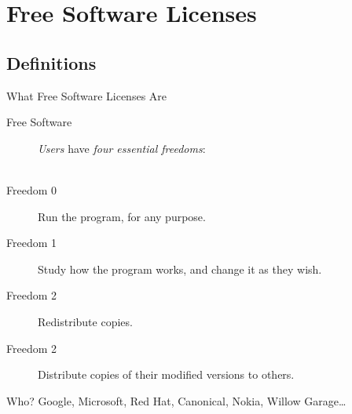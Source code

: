 
%

\begin{frame}[t,plain]
  \maketitle
\end{frame}

\begin{frame}
  \tableofcontents
\end{frame}

\section{Free Software Licenses}

  \begin{frame}
    \tableofcontents[currentsection]
  \end{frame}

%
\subsection{Definitions}

  \begin{frame}{What Free Software Licenses Are}
    \begin{description}
      \item[Free Software] \emph{Users} have \emph{\alert{four essential freedoms}}:\\~\\
      \item[Freedom 0] Run the program, for any purpose.
      \item[Freedom 1] Study how the program works, and change it as they wish.
      \item[Freedom 2] Redistribute copies.
      \item[Freedom 2] Distribute copies of their modified versions to others. 
    \end{description}
    \begin{block}{Who?}
      Google, Microsoft, Red Hat, Canonical, Nokia, Willow Garage\dots
    \end{block}
  \end{frame}

